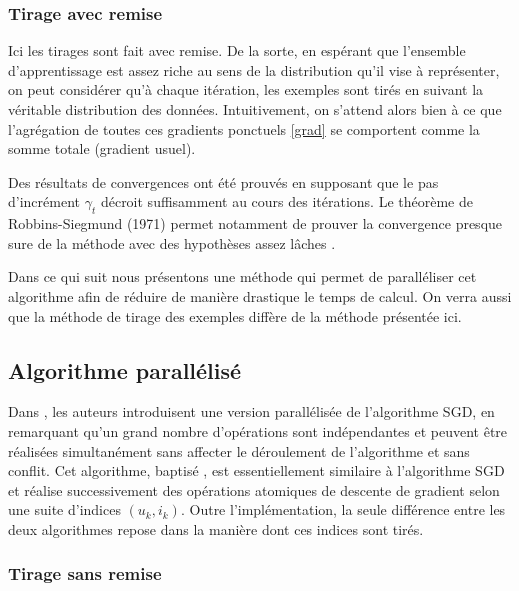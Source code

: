 \documentclass[10pt,a4paper]{article}
\begin{document}
\subsubsection*{Tirage avec remise}

Ici les tirages sont fait avec remise. De la sorte, en espérant que l'ensemble d'apprentissage est assez riche au sens de la distribution qu'il vise à représenter, on peut considérer qu'à chaque itération, les exemples sont tirés en suivant la véritable distribution des données. Intuitivement, on s'attend alors bien à ce que l'agrégation de toutes ces gradients ponctuels \eqref{grad} se comportent comme la somme totale (gradient usuel).

Des résultats de convergences ont été prouvés en supposant que le pas d'incrément $\gamma_t$ décroit suffisamment au cours des itérations. Le théorème de Robbins-Siegmund (1971) permet notamment de prouver la convergence presque sure de la méthode avec des hypothèses assez lâches \cite{bottouSGD}.

Dans ce qui suit nous présentons une méthode qui permet de paralléliser cet algorithme afin de réduire de manière drastique le temps de calcul. On verra aussi que la méthode de tirage des exemples diffère de la méthode présentée ici.

\subsection{Algorithme parallélisé \jel }

Dans \cite{jelly}, les auteurs introduisent une version parallélisée de l'algorithme SGD, en remarquant qu'un grand nombre d'opérations sont indépendantes et peuvent être réalisées simultanément sans affecter le déroulement de l'algorithme et sans conflit. Cet algorithme, baptisé \jel, est essentiellement similaire à l'algorithme SGD et réalise successivement des opérations atomiques de descente de gradient selon une suite d'indices $(u_k,i_k)$. Outre l'implémentation, la seule différence entre les deux algorithmes repose dans la manière dont ces indices sont tirés.

\subsubsection*{Tirage sans remise}
\end{document}
